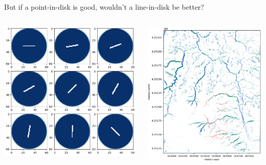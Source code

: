 \documentclass[aspectratio=169]{beamer}
\begin{document}
\begin{frame}{But if a point-in-disk is good, wouldn't a line-in-disk be better?}
\vspace{0.5 cm}
\begin{columns}
\includegraphics[width=\linewidth]{img/angled-convolution-kernels.png}

\includegraphics[width=\linewidth]{img/angled-convolution-results.png}

\end{columns}
\end{frame}
\end{document}
